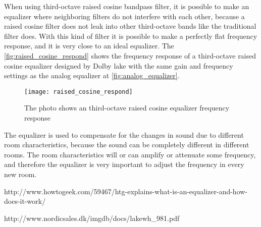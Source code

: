 When using third-octave raised cosine bandpass filter, it is possible to make an equalizer where neighboring filters do not interfere with each other, because a raised cosine filter does not leak into other third-octave bands like the traditional filter does. With this kind of filter it is possible to make a perfectly flat frequency response, and it is very close to an ideal equalizer. The \autoref{fig:raised_cosine_respond} shows the frequency response of a third-octave raised cosine equalizer designed by Dolby lake with the same gain and frequency settings as the analog equalizer at \autoref{fig:analog_equalizer}.

\begin{figure} [htbp]
 \centering
  \texttt{[image: raised\_cosine\_respond]}
  \caption{The photo shows an third-octave raised cosine equalizer frequency response  %
  }
  \label{fig:raised_cosine_respond}
\end{figure}


The equalizer is used to compensate for the changes in sound due to different room characteristics, because the sound can be completely different in different rooms. The room characteristics will or can amplify or attenuate some frequency, and therefore the equalizer is very important to adjust the frequency in every new room. 



http://www.howtogeek.com/59467/htg-explains-what-is-an-equalizer-and-how-does-it-work/

http://www.nordicsales.dk/imgdb/docs/lakewh_981.pdf
